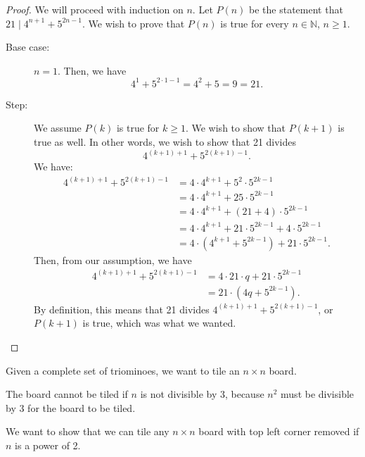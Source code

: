 \begin{proof}
	We will proceed with induction on \( n \). Let \( P(n) \) be the statement that \( 21 \mid 4^{n+1} + 5^{2n-1} \). We wish to prove that \( P(n) \) is true for every \( n \in \mathbb{N} \), \( n \ge 1 \).
	\begin{description}
		\item[Base case:] \( n = 1 \). Then, we have \[
				4^1+5^{2 \cdot 1 - 1} = 4^2 + 5 = 9 = 21
		.\] 
		\item[Step:] We assume \( P(k) \) is true for \( k \ge 1 \). We wish to show that \( P(k+1) \) is true as well. In other words, we wish to show that 21 divides \[
			4^{(k+1)+1} + 5^{2(k+1)-1}
		.\] We have:
		\begin{align*}
			4^{(k+1)+1} + 5^{2(k+1)-1} &= 4 \cdot 4^{k+1} + 5^2 \cdot 5^{2k-1} \\
																	&= 4 \cdot 4^{k+1} + 25 \cdot 5^{2k-1} \\
																	&= 4 \cdot 4^{k+1} + (21 + 4) \cdot 5^{2k-1} \\
																	&= 4 \cdot 4^{k+1} + 21 \cdot 5^{2k-1} + 4 \cdot 5^{2k-1} \\
																	&= 4 \cdot \left( 4^{k+1} + 5^{2k-1}\right) + 21 \cdot 5^{2k-1}
		.\end{align*}
		Then, from our assumption, we have 
		\begin{align*}
			4^{(k+1)+1} + 5^{2(k+1)-1}  &= 4 \cdot 21\cdot q + 21 \cdot 5^{2k-1}  \\
																	&= 21 \cdot (4q + 5^{2k-1})
		.\end{align*}
		By definition, this means that 21 divides \( 4^{(k+1)+1} + 5^{2(k+1)-1} \), or \( P(k+1) \) is true, which was what we wanted.
	\end{description}
\end{proof}

\begin{eg}
	Given a complete set of triominoes, we want to tile an \( n\times n \) board. 
	\begin{observe}
		The board cannot be tiled if \( n \) is not divisible by 3, because \( n^2 \) must be divisible by 3 for the board to be tiled.
	\end{observe}
	We want to show that we can tile any \( n \times n \) board with top left corner removed if \( n \) is a power of 2.
\end{eg}

